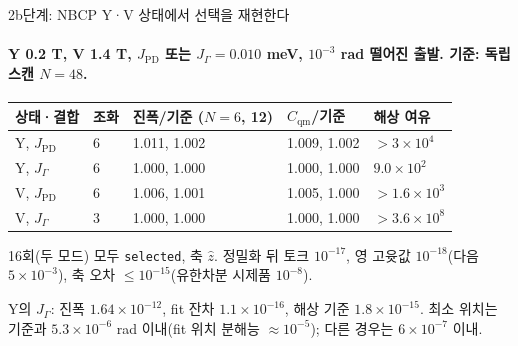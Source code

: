 \begin{frame}[label=stage2b-verification]{2b단계: NBCP Y·V 상태에서 선택을 재현한다}
  \framesubtitle{Y 0.2 T, V 1.4 T, $J_{\mathrm{PD}}$ 또는 $J_\Gamma=0.010$ meV, $10^{-3}$ rad 떨어진 출발. 기준: 독립 스캔 $N=48$.}
  \small
  \begin{tabularx}{\textwidth}{@{}YP{1.1cm}P{2.0cm}P{2.0cm}P{1.6cm}@{}}
    \toprule
    상태·결합 & 조화 & 진폭/기준 ($N=6$, 12) & $C_{\mathrm{qm}}$/기준 & 해상 여유 \\
    \midrule
    Y, $J_{\mathrm{PD}}$ & 6 & 1.011, 1.002 & 1.009, 1.002 & $>3\times10^{4}$ \\
    Y, $J_\Gamma$ & 6 & 1.000, 1.000 & 1.000, 1.000 & $9.0\times10^{2}$ \\
    V, $J_{\mathrm{PD}}$ & 6 & 1.006, 1.001 & 1.005, 1.000 & $>1.6\times10^{3}$ \\
    V, $J_\Gamma$ & 3 & 1.000, 1.000 & 1.000, 1.000 & $>3.6\times10^{8}$ \\
    \bottomrule
  \end{tabularx}
  \par\medskip
  16회(두 모드) 모두 \texttt{selected}, 축 $\hat z$. 정밀화 뒤 토크 $10^{-17}$, 영 고윳값 $10^{-18}$(다음 $5\times10^{-3}$), 축 오차 $\le10^{-15}$(유한차분 시제품 $10^{-8}$).
  \par\medskip
  Y의 $J_\Gamma$: 진폭 $1.64\times10^{-12}$, fit 잔차 $1.1\times10^{-16}$, 해상 기준 $1.8\times10^{-15}$. 최소 위치는 기준과 $5.3\times10^{-6}$ rad 이내(fit 위치 분해능 $\approx10^{-5}$); 다른 경우는 $6\times10^{-7}$ 이내.
  \par\medskip
\end{frame}

